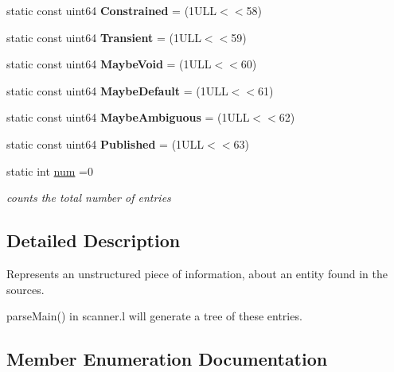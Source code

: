 \begin{DoxyCompactItemize}
\item 
\mbox{\label{class_entry_a025979519b66924ba3cc1de357998f1f}} 
static const uint64 {\bfseries Constrained} = (1\+U\+L\+L$<$$<$58)
\item 
\mbox{\label{class_entry_a4002f093ccd2b3d3c78c443135757cee}} 
static const uint64 {\bfseries Transient} = (1\+U\+L\+L$<$$<$59)
\item 
\mbox{\label{class_entry_ac4db81b56383103198fda03a5bfe32f7}} 
static const uint64 {\bfseries Maybe\+Void} = (1\+U\+L\+L$<$$<$60)
\item 
\mbox{\label{class_entry_a7fd65cf61e33aa95cef95d5789f61063}} 
static const uint64 {\bfseries Maybe\+Default} = (1\+U\+L\+L$<$$<$61)
\item 
\mbox{\label{class_entry_ae3e84af12e322ab715e5ae191d92d1c7}} 
static const uint64 {\bfseries Maybe\+Ambiguous} = (1\+U\+L\+L$<$$<$62)
\item 
\mbox{\label{class_entry_a2dffe3090d7636a879832be07aec6a0a}} 
static const uint64 {\bfseries Published} = (1\+U\+L\+L$<$$<$63)
\item 
\mbox{\label{class_entry_a11f13875c6f9f3f9bed32e97a5d50bf5}} 
static int \mbox{\hyperlink{class_entry_a11f13875c6f9f3f9bed32e97a5d50bf5}{num}} =0
\begin{DoxyCompactList}\small\item\em counts the total number of entries \end{DoxyCompactList}\end{DoxyCompactItemize}


\subsection{Detailed Description}
Represents an unstructured piece of information, about an entity found in the sources.

parse\+Main() in scanner.\+l will generate a tree of these entries. 

\subsection{Member Enumeration Documentation}
\mbox{\label{class_entry_a470b655d0d6179559a11a81e6617d509}} 

